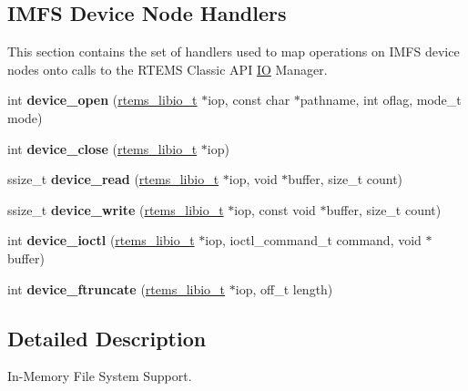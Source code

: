 \subsection*{I\+M\+FS Device Node Handlers}
\label{_amgrp89b0e1e4db1e5f748f8aa607fb73ab36}%
This section contains the set of handlers used to map operations on I\+M\+FS device nodes onto calls to the R\+T\+E\+MS Classic A\+PI \mbox{\hyperlink{structIO}{IO}} Manager. \begin{DoxyCompactItemize}
\item 
\mbox{\label{group__IMFS_ga78e4532483c1961750710ba02459778d}} 
int {\bfseries device\+\_\+open} (\mbox{\hyperlink{structrtems__libio__tt}{rtems\+\_\+libio\+\_\+t}} $\ast$iop, const char $\ast$pathname, int oflag, mode\+\_\+t mode)
\item 
\mbox{\label{group__IMFS_ga7e7b2638aad0d81ea5d509fb9ec55804}} 
int {\bfseries device\+\_\+close} (\mbox{\hyperlink{structrtems__libio__tt}{rtems\+\_\+libio\+\_\+t}} $\ast$iop)
\item 
\mbox{\label{group__IMFS_ga838bcd4c214871609b75cb983df3f699}} 
ssize\+\_\+t {\bfseries device\+\_\+read} (\mbox{\hyperlink{structrtems__libio__tt}{rtems\+\_\+libio\+\_\+t}} $\ast$iop, void $\ast$buffer, size\+\_\+t count)
\item 
\mbox{\label{group__IMFS_ga827f7421e7a7d9d12195c12f697818ac}} 
ssize\+\_\+t {\bfseries device\+\_\+write} (\mbox{\hyperlink{structrtems__libio__tt}{rtems\+\_\+libio\+\_\+t}} $\ast$iop, const void $\ast$buffer, size\+\_\+t count)
\item 
\mbox{\label{group__IMFS_ga3881c2f6c101e59138bd97bc1f8b588e}} 
int {\bfseries device\+\_\+ioctl} (\mbox{\hyperlink{structrtems__libio__tt}{rtems\+\_\+libio\+\_\+t}} $\ast$iop, ioctl\+\_\+command\+\_\+t command, void $\ast$buffer)
\item 
\mbox{\label{group__IMFS_gaaaa795616cc380662f57fabdd8b6e5ee}} 
int {\bfseries device\+\_\+ftruncate} (\mbox{\hyperlink{structrtems__libio__tt}{rtems\+\_\+libio\+\_\+t}} $\ast$iop, off\+\_\+t length)
\end{DoxyCompactItemize}


\subsection{Detailed Description}
In-\/\+Memory File System Support. 



